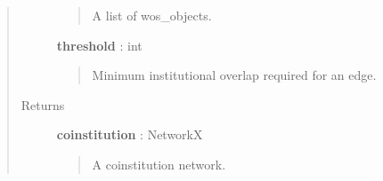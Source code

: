 \documentclass[letterpaper,10pt,english]{sphinxmanual}
\begin{document}
\begin{fulllineitems}
\begin{quote}
\begin{description}
\begin{quote}
A list of wos\_objects.
\end{quote}

\textbf{threshold} : int
\begin{quote}

Minimum institutional overlap required for an edge.
\end{quote}

\item[{Returns}] \leavevmode
\textbf{coinstitution} : NetworkX 
\begin{quote}

A coinstitution network.
\end{quote}

\end{description}\end{quote}

\end{fulllineitems}

\end{document}
